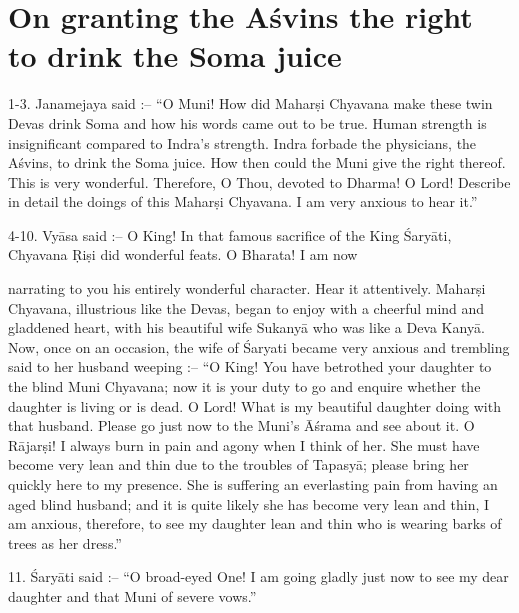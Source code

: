 \chapter{On granting the A\'svins the right to drink the Soma juice}

1-3. Janamejaya said :-- ``O Muni! How did Mahar\d{s}i Chyavana make these twin Devas drink Soma and how his words came out to be true. Human strength is insignificant compared to Indra's strength. Indra forbade the physicians, the A\'svins, to drink the Soma juice. How then could the Muni give the right thereof. This is very wonderful. Therefore, O Thou, devoted to Dharma! O Lord! Describe in detail the doings of this Mahar\d{s}i Chyavana. I am very anxious to hear it.''

4-10. Vy\=asa said :-- O King! In that famous sacrifice of the King \'Sary\=ati, Chyavana \d{R}i\d{s}i did wonderful feats. O Bharata! I am now

narrating to you his entirely wonderful character. Hear it attentively. Mahar\d{s}i Chyavana, illustrious like the Devas, began to enjoy with a cheerful mind and gladdened heart, with his beautiful wife Sukany\=a who was like a Deva Kany\=a. Now, once on an occasion, the wife of \'Saryati became very anxious and trembling said to her husband weeping :-- ``O King! You have betrothed your daughter to the blind Muni Chyavana; now it is your duty to go and enquire whether the daughter is living or is dead. O Lord! What is my beautiful daughter doing with that husband. Please go just now to the Muni's \=A\'srama and see about it. O R\=ajar\d{s}i! I always burn in pain and agony when I think of her. She must have become very lean and thin due to the troubles of Tapasy\=a; please bring her quickly here to my presence. She is suffering an everlasting pain from having an aged blind husband; and it is quite likely she has become very lean and thin, I am anxious, therefore, to see my daughter lean and thin who is wearing barks of trees as her dress.''

11. \'Sary\=ati said :-- ``O broad-eyed One! I am going gladly just now to see my dear daughter and that Muni of severe vows.''

